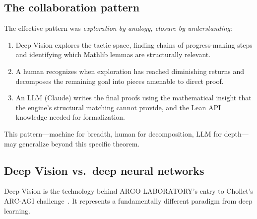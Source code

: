 \documentclass[11pt]{article}
\theoremstyle{definition}
\theoremstyle{remark}
\begin{document}
\subsection{The collaboration pattern}

The effective pattern was \emph{exploration by analogy, closure by understanding}:
\begin{enumerate}
\item Deep Vision explores the tactic space, finding chains of progress-making steps and identifying which Mathlib lemmas are structurally relevant.
\item A human recognizes when exploration has reached diminishing returns and decomposes the remaining goal into pieces amenable to direct proof.
\item An LLM (Claude) writes the final proofs using the mathematical insight that the engine's structural matching cannot provide, and the Lean API knowledge needed for formalization.
\end{enumerate}

This pattern---machine for breadth, human for decomposition, LLM for depth---may generalize beyond this specific theorem.

\subsection{Deep Vision vs.\ deep neural networks}

Deep Vision is the technology behind ARGO LABORATORY's entry to Chollet's ARC-AGI challenge~\cite{chollet_measure_2019}.  It represents a fundamentally different paradigm from deep learning.
\end{document}
